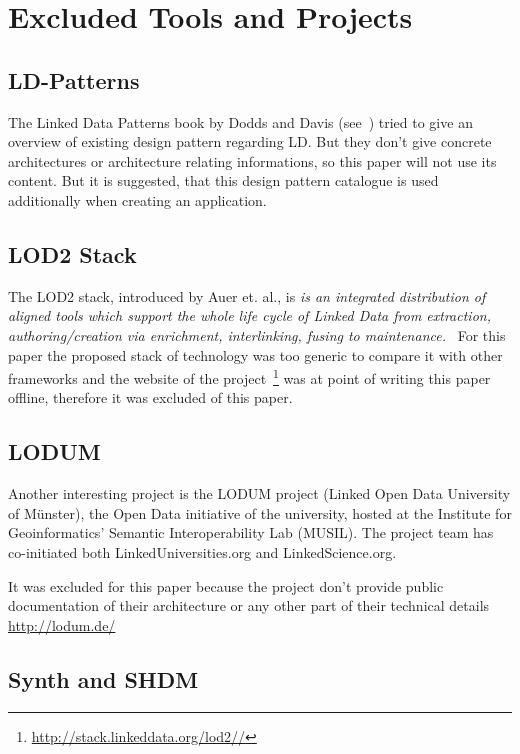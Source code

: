 \newpage
\section{Excluded Tools and Projects}\label{excluded}

\subsection{LD-Patterns}
The Linked Data Patterns book by Dodds and Davis (see~\cite{dodds2011linked}) tried to give an overview of existing design pattern regarding LD. But they don't give concrete architectures or architecture relating informations, so this paper will not use its content. But it is suggested, that this design pattern catalogue is used additionally when creating an application.

\subsection{LOD2 Stack}

The LOD2 stack, introduced by Auer et. al., is \emph{is an integrated distribution of aligned tools which support the whole life cycle of Linked Data from extraction, authoring/creation via enrichment, interlinking, fusing to maintenance.}~\cite{auer2012managing} For this paper the proposed stack of technology was too generic to compare it with other frameworks and the website of the project~\footnote{\url{http://stack.linkeddata.org/lod2//}} was at point of writing this paper offline, therefore it was excluded of this paper.

\subsection{LODUM}

Another interesting project is the LODUM project (Linked Open Data University of Münster), the Open Data initiative of the university, hosted at the Institute for Geoinformatics' Semantic Interoperability Lab (MUSIL). The project team has co-initiated both LinkedUniversities.org and LinkedScience.org.

It was excluded for this paper because the project don't provide public documentation of their architecture or any other part of their technical details
\url{http://lodum.de/}

\subsection{Synth and SHDM}

